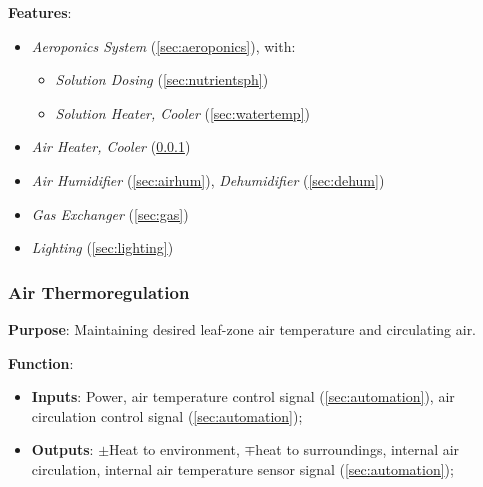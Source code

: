 \documentclass{report}
\begin{document}
\textbf{Features}:
\begin{itemize}
    \item \textit{Aeroponics System} (\ref{sec:aeroponics}), with:
    \begin{itemize}
        \item \textit{Solution Dosing} (\ref{sec:nutrientsph})
        \item \textit{Solution Heater, Cooler} (\ref{sec:watertemp})
    \end{itemize}
    \item \textit{Air Heater, Cooler} (\ref{sec:airthermoregulation})
    \item \textit{Air Humidifier} (\ref{sec:airhum}), \textit{Dehumidifier} (\ref{sec:dehum})
    \item \textit{Gas Exchanger} (\ref{sec:gas})
    \item \textit{Lighting} (\ref{sec:lighting})
\end{itemize}

\newpage

\subsubsection{Air Thermoregulation}
\label{sec:airthermoregulation}

\textbf{Purpose}: Maintaining desired leaf-zone air temperature and circulating air.

\textbf{Function}:
\begin{itemize}
    \item \textbf{Inputs}: Power, air temperature control signal (\ref{sec:automation}), air circulation control signal (\ref{sec:automation});
    \item \textbf{Outputs}: $\pm$Heat to environment, $\mp$heat to surroundings, internal air circulation, internal air temperature sensor signal (\ref{sec:automation});
\end{itemize}
\end{document}
